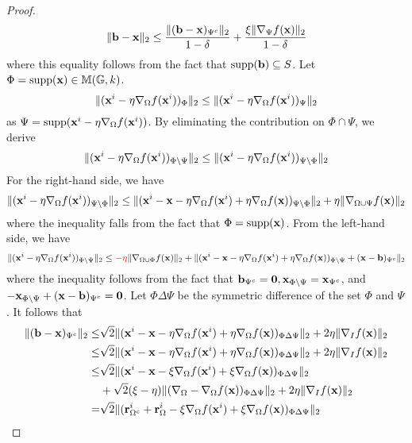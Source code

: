 \documentclass{article}
\begin{document}
\begin{proof}
\begin{equation}
\|{\bf b}-{\bf x}\|_2\leq\frac{\|({\bf b}-{\bf x})_{\Psi^c}\|_2}{1-\delta}+\frac{\xi\|\nabla_{\Psi}f({\bf x})\|_2}{1-\delta}
\end{equation}
where this equality follows from the fact that $\mathrm{supp}({\bf b})\subseteq S$. Let $\Phi=\mathrm{supp}({\bf x})\in\mathbb{M}(\mathbb{G},k)$.
\[
\|({\bf x}^i-\eta\nabla_{\Omega}f({\bf x}^i))_{\Phi}\|_2\leq\|({\bf x}^i-\eta\nabla_{\Omega}f({\bf x}^i))_{\Psi}\|_2
\]
as $\Psi=\mathrm{supp}({\bf x}^i-\eta\nabla_{\Omega}f({\bf x}^i))$. By eliminating the contribution on $\Phi\cap\Psi$, we derive
\[
\|({\bf x}^i-\eta\nabla_{\Omega}f({\bf x}^i))_{\Phi\setminus\Psi}\|_2\leq\|({\bf x}^i-\eta\nabla_{\Omega}f({\bf x}^i))_{\Psi\setminus\Phi}\|_2
\]
For the right-hand side, we have
\[
\|({\bf x}^i-\eta\nabla_{\Omega}f({\bf x}^i))_{\Psi\setminus\Phi}\|_2\leq\|({\bf x}^i-{\bf x}-\eta\nabla_{\Omega}f({\bf x}^i)+\eta\nabla_{\Omega}f({\bf x}))_{\Psi\setminus\Phi}\|_2+\eta\|\nabla_{\Omega\cup\Psi}f({\bf x})\|_2
\]
where the inequality falls from the fact that $\Phi=\mathrm{supp}({\bf x})$. From the left-hand side, we have
\[
\|({\bf x}^i-\eta\nabla_{\Omega}f({\bf x}^i))_{\Phi\setminus\Psi}\|_2\leq{\color{red}{-\eta}}\|\nabla_{\Omega\cup\Phi}f({\bf x})\|_2+\|({\bf x}^i-{\bf x}-\eta\nabla_{\Omega}f({\bf x}^i)+\eta\nabla_{\Omega}f({\bf x}))_{\Phi\setminus\Psi}+({\bf x}-{\bf b})_{\Psi^c}\|_2
\]
where the inequality follows from the fact that ${\bf b}_{\Psi^c}={\bf 0},{\bf x}_{\Phi\setminus\Psi}={\bf x}_{\Psi^c}$, and $-{\bf x}_{\Phi\setminus\Psi}+({\bf x}-{\bf b})_{\Psi^c}={\bf 0}$. Let $\Phi\Delta\Psi$ be the symmetric difference of the set $\Phi$ and $\Psi$. It follows that
\begin{align*}
\|({\bf b}-{\bf x})_{\Psi^c}\|_2\leq&\sqrt{2}\|({\bf x}^i-{\bf x}-\eta\nabla_{\Omega}f({\bf x}^i)+\eta\nabla_{\Omega}f({\bf x}))_{\Phi\Delta\Psi}\|_2+2\eta\|\nabla_I f({\bf x})\|_2\\
\leq&\sqrt{2}\|({\bf x}^i-{\bf x}-\eta\nabla_{\Omega} f({\bf x}^i)+\eta\nabla_{\Omega}f({\bf x}))_{\Phi\Delta\Psi}\|_2+2\eta\|\nabla_I f({\bf x})\|_2\\
\leq&\sqrt{2}\|({\bf x}^i-{\bf x}-\xi\nabla_{\Omega} f({\bf x}^i)+\xi\nabla_{\Omega}f({\bf x}))_{\Phi\Delta\Psi}\|_2\\
&+\sqrt{2}(\xi-\eta)\|(\nabla_{\Omega}-\nabla_{\Omega}f({\bf x}))_{\Phi\Delta\Psi}\|_2+2\eta\|\nabla_I f({\bf x})\|_2\\
=&\sqrt{2}\|({\bf r}_{\Omega^c}^i+{\bf r}_{\Omega}^i-\xi\nabla_{\Omega}f({\bf x}^i)+\xi\nabla_{\Omega} f({\bf x}))_{\Phi\Delta\Psi}\|_2\\

\end{align*}
\end{proof}
\end{document}
